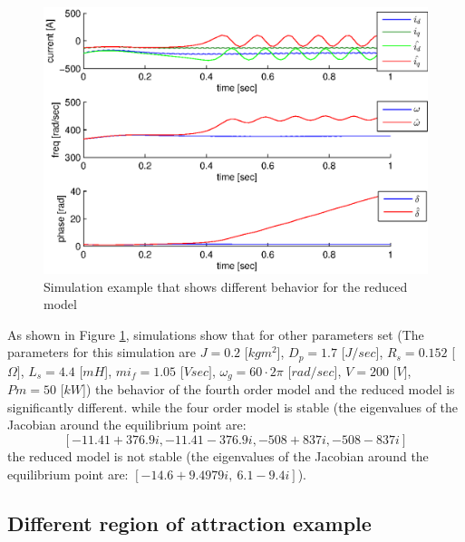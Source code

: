 \documentclass[conference]{IEEEtran}
\begin{document}
\begin{figure}[h]
\includegraphics[scale=0.5]{simDiffBehavior1}

\caption{Simulation example that shows different behavior for the 
         reduced model}
\label{fig:InfBusOne1DiffBehavior1}
\end{figure}

As shown in Figure \ref{fig:InfBusOne1DiffBehavior1}, simulations
show that for other parameters set (The parameters for this simulation
are $J=0.2$ {[}$kgm^{2}${]}, $D_{p}=1.7$ {[}$J/sec${]}, $R_{s}=0.152$
{[}$\Omega]$, $L_{s}=4.4$ {[}$mH${]}, $mi_{f}=1.05$ {[}$Vsec]$,
$\omega_{g}=60\cdotp2\pi$ {[}$rad/sec${]}, $V=200$ {[}$V]$, $Pm=50$
{[}$kW${]}) the behavior of the fourth order model and the reduced
model is significantly different. while the four order model is stable
(the eigenvalues of the Jacobian around the equilibrium point are:
$$\left[-11.41+376.9i,-11.41-376.9i,-508+837i,-508-837i\right]$$
the reduced model is not stable (the eigenvalues of the Jacobian
around the equilibrium point are: 
$\left[-14.6+9.4979i,\:6.1-9.4i\right]$).

\subsection{Different region of attraction example}
\end{document}
